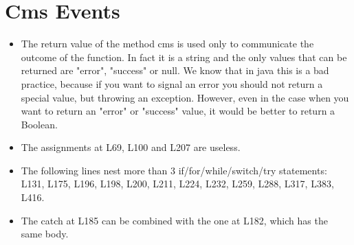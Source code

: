 \section{Cms Events}
\begin{itemize}
\item The return value of the method cms is used only to communicate the outcome of the function. In fact it is a string and the only values that can be returned are "error", "success" or null. We know that in java this is a bad practice, because if you want to signal an error you should not return a special value, but throwing an exception. However, even in the case when you want to return an "error" or "success" value, it would be better to return a Boolean.
\item The assignments at L69, L100 and L207 are useless.
\item The following lines nest more than 3 if/for/while/switch/try statements: L131, L175, L196, L198, L200, L211, L224, L232, L259, L288, L317, L383, L416.
\item The catch at L185 can be combined with the one at L182, which has the same body.
\end{itemize}
